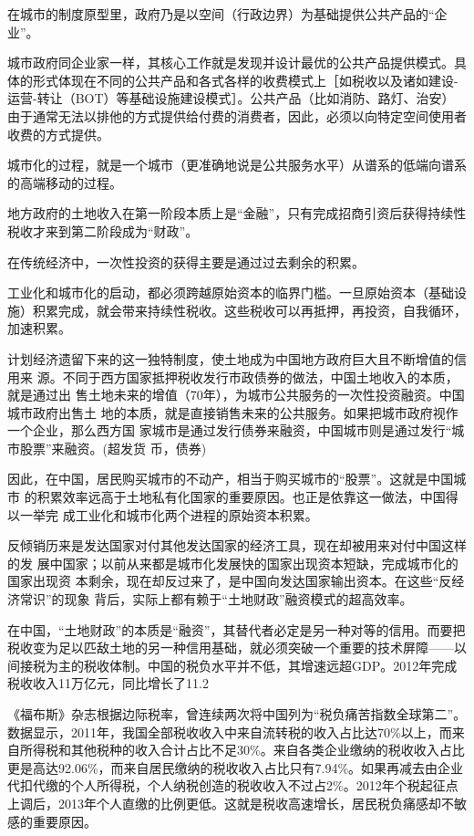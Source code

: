 在城市的制度原型里，政府乃是以空间（行政边界）为基础提供公共产品的“企业”。

城市政府同企业家一样，其核心工作就是发现并设计最优的公共产品提供模式。具体的形式体现在不同的公共产品和各式各样的收费模式上［如税收以及诸如建设-运营-转让（BOT）等基础设施建设模式］。公共产品（比如消防、路灯、治安）由于通常无法以排他的方式提供给付费的消费者，因此，必须以向特定空间使用者收费的方式提供。

城市化的过程，就是一个城市（更准确地说是公共服务水平）从谱系的低端向谱系的高端移动的过程。

地方政府的土地收入在第一阶段本质上是“金融”，只有完成招商引资后获得持续性税收才来到第二阶段成为“财政”。

在传统经济中，一次性投资的获得主要是通过过去剩余的积累。

工业化和城市化的启动，都必须跨越原始资本的临界门槛。一旦原始资本（基础设施）积累完成，就会带来持续性税收。这些税收可以再抵押，再投资，自我循环，加速积累。

计划经济遗留下来的这一独特制度，使土地成为中国地方政府巨大且不断增值的信用来
源。不同于西方国家抵押税收发行市政债券的做法，中国土地收入的本质，就是通过出
售土地未来的增值（70年），为城市公共服务的一次性投资融资。中国城市政府出售土
地的本质，就是直接销售未来的公共服务。如果把城市政府视作一个企业，那么西方国
家城市是通过发行债券来融资，中国城市则是通过发行“城市股票”来融资。(超发货
币，债券)

因此，在中国，居民购买城市的不动产，相当于购买城市的“股票”。这就是中国城市
的积累效率远高于土地私有化国家的重要原因。也正是依靠这一做法，中国得以一举完
成工业化和城市化两个进程的原始资本积累。

反倾销历来是发达国家对付其他发达国家的经济工具，现在却被用来对付中国这样的发
展中国家；以前从来都是城市化发展快的国家出现资本短缺，完成城市化的国家出现资
本剩余，现在却反过来了，是中国向发达国家输出资本。在这些“反经济常识”的现象
背后，实际上都有赖于“土地财政”融资模式的超高效率。

在中国，“土地财政”的本质是“融资”，其替代者必定是另一种对等的信用。而要把税收变为足以匹敌土地的另一种信用基础，就必须突破一个重要的技术屏障——以间接税为主的税收体制。中国的税负水平并不低，其增速远超GDP。2012年完成税收收入11万亿元，同比增长了11.2%

《福布斯》杂志根据边际税率，曾连续两次将中国列为“税负痛苦指数全球第二”。
数据显示，2011年，我国全部税收收入中来自流转税的收入占比达70\%以上，而来自所得税和其他税种的收入合计占比不足30\%。来自各类企业缴纳的税收收入占比更是高达92.06\%，而来自居民缴纳的税收收入占比只有7.94\%。如果再减去由企业代扣代缴的个人所得税，个人纳税创造的税收收入不过占2\%。2012年个税起征点上调后，2013年个人直缴的比例更低。这就是税收高速增长，居民税负痛感却不敏感的重要原因。

